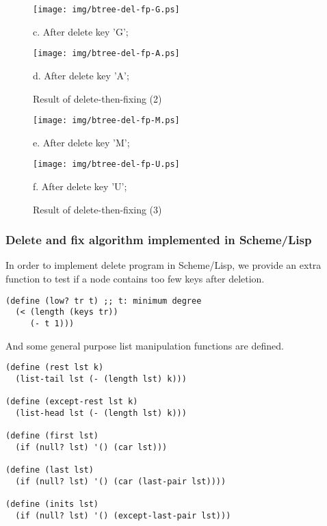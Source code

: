 \documentclass{article}
\begin{document}
\begin{figure}[htbp]
    \begin{center}
      \texttt{[image: img/btree-del-fp-G.ps]}

      c. After delete key 'G';

      \texttt{[image: img/btree-del-fp-A.ps]}

      d. After delete key 'A';
      \caption{Result of delete-then-fixing (2)} \label{fig:result-del-fp2}
    \end{center}
\end{figure}

\begin{figure}[htbp]
    \begin{center}
      \texttt{[image: img/btree-del-fp-M.ps]}

      e. After delete key 'M';

      \texttt{[image: img/btree-del-fp-U.ps]}

      f. After delete key 'U';
      \caption{Result of delete-then-fixing (3)} \label{fig:result-del-fp3}
    \end{center}
\end{figure}


\subsubsection{Delete and fix algorithm implemented in Scheme/Lisp}
In order to implement delete program in Scheme/Lisp, we provide an
extra function to test if a node contains too few keys after deletion.

\lstset{language=lisp}
\begin{lstlisting}
(define (low? tr t) ;; t: minimum degree
  (< (length (keys tr))
     (- t 1)))
\end{lstlisting}

And some general purpose list manipulation functions are defined.

\begin{lstlisting}
(define (rest lst k)
  (list-tail lst (- (length lst) k)))

(define (except-rest lst k)
  (list-head lst (- (length lst) k)))

(define (first lst)
  (if (null? lst) '() (car lst)))

(define (last lst)
  (if (null? lst) '() (car (last-pair lst))))

(define (inits lst)
  (if (null? lst) '() (except-last-pair lst)))
\end{lstlisting}
\end{document}
